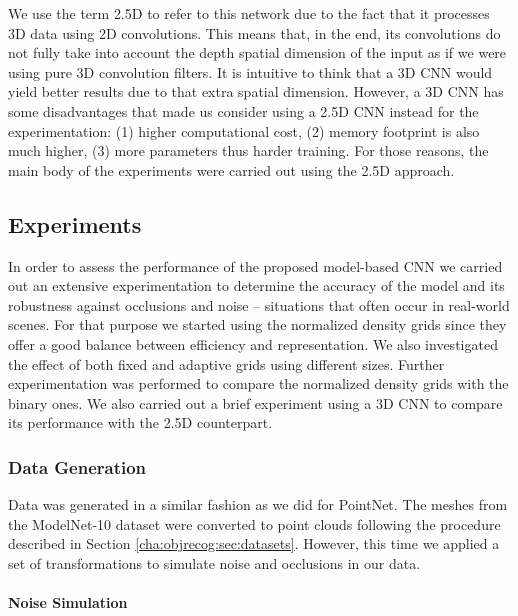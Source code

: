 We use the term \acs{2.5D} to refer to this network due to the fact that it processes \acs{3D} data using \acs{2D} convolutions. This means that, in the end, its convolutions do not fully take into account the depth spatial dimension of the input as if we were using pure \acs{3D} convolution filters. It is intuitive to think that a \acs{3D} \acs{CNN} would yield better results due to that extra spatial dimension. However, a \acs{3D} \acs{CNN} has some disadvantages that made us consider using a \acs{2.5D} \acs{CNN} instead for the experimentation: (1) higher computational cost, (2) memory footprint is also much higher, (3) more parameters thus harder training. For those reasons, the main body of the experiments were carried out using the \acs{2.5D} approach.

\subsection{Experiments}
\label{cha:objrecog:sec:study:subsec:experiments}

In order to assess the performance of the proposed model-based \acs{CNN} we carried out an extensive experimentation to determine the accuracy of the model and its robustness against occlusions and noise -- situations that often occur in real-world scenes. For that purpose we started using the normalized density grids since they offer a good balance between efficiency and representation. We also investigated the effect of both fixed and adaptive grids using different sizes. Further experimentation was performed to compare the normalized density grids with the binary ones. We also carried out a brief experiment using a \acs{3D} \acs{CNN} to compare its performance with the \acs{2.5D} counterpart.

\subsubsection{Data Generation}
\label{cha:objrecog:sec:study:subsec:experiments:subsubsec:data}

Data was generated in a similar fashion as we did for PointNet. The meshes from the ModelNet-10 dataset were converted to point clouds following the procedure described in Section \ref{cha:objrecog:sec:datasets}. However, this time we applied a set of transformations to simulate noise and occlusions in our data.

\paragraph{Noise Simulation}

